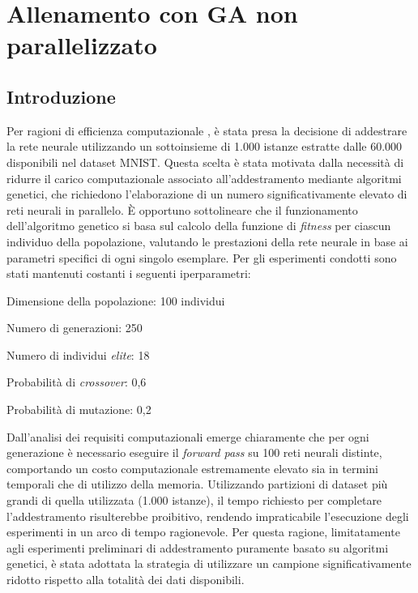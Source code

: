 \section{Allenamento con GA non parallelizzato}
\subsection{Introduzione}
Per ragioni di efficienza computazionale , è stata presa la decisione di addestrare la rete neurale utilizzando un sottoinsieme di 1.000 istanze estratte dalle 60.000 disponibili nel dataset MNIST. Questa scelta è stata motivata dalla necessità di ridurre il carico computazionale associato all'addestramento mediante algoritmi genetici, che richiedono l'elaborazione di un numero significativamente elevato di reti neurali in parallelo.
È opportuno sottolineare che il funzionamento dell'algoritmo genetico si basa sul calcolo della funzione di \textit{fitness} per ciascun individuo della popolazione, valutando le prestazioni della rete neurale in base ai parametri specifici di ogni singolo esemplare. Per gli esperimenti condotti sono stati mantenuti costanti i seguenti iperparametri:

\begin{compactitemize}
    \item Dimensione della popolazione: 100 individui
    \item Numero di generazioni: 250
    \item Numero di individui \textit{elite}: 18
    \item Probabilità di \textit{crossover}: 0,6
    \item Probabilità di mutazione: 0,2
\end{compactitemize}

Dall'analisi dei requisiti computazionali emerge chiaramente che per ogni generazione è necessario eseguire il \textit{forward pass} su 100 reti neurali distinte, comportando un costo computazionale estremamente elevato sia in termini temporali che di utilizzo della memoria. Utilizzando partizioni di dataset più grandi di quella utilizzata (1.000 istanze), il tempo richiesto per completare l'addestramento risulterebbe proibitivo, rendendo impraticabile l'esecuzione degli esperimenti in un arco di tempo ragionevole. 
Per questa ragione, limitatamente agli esperimenti preliminari di addestramento puramente basato su algoritmi genetici, è stata adottata la strategia di utilizzare un campione significativamente ridotto rispetto alla totalità dei dati disponibili.

